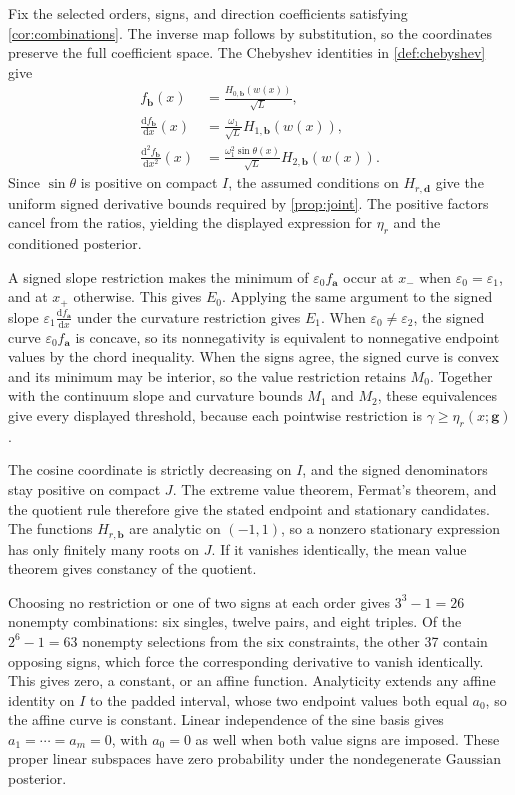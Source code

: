 \begin{proofEnd}
Fix the selected orders, signs, and direction coefficients satisfying
\cref{cor:combinations}. The inverse map follows by substitution, so
the coordinates preserve the full coefficient space. The Chebyshev identities in
\cref{def:chebyshev} give
\[
 \begin{aligned}
 f_{\boldsymbol b}(x)&=\frac{H_{0,\boldsymbol b}(w(x))}{\sqrt L},\\
 \frac{\mathrm{d}f_{\boldsymbol b}}{\mathrm{d}x}(x)
    &=\frac{\omega_1}{\sqrt L}H_{1,\boldsymbol b}(w(x)),\\
 \frac{\mathrm{d}^2f_{\boldsymbol b}}{\mathrm{d}x^2}(x)
    &=\frac{\omega_1^2\sin\theta(x)}{\sqrt L}
       H_{2,\boldsymbol b}(w(x)).
 \end{aligned}
\]
Since $\sin\theta$ is positive on compact $I$, the assumed conditions
on $H_{r,\boldsymbol d}$ give the uniform signed derivative bounds
required by \cref{prop:joint}. The positive factors cancel from the
ratios, yielding the displayed expression for $\eta_r$ and the
conditioned posterior.

A signed slope restriction makes the minimum of
$\varepsilon_0 f_{\boldsymbol a}$ occur at $x_-$ when
$\varepsilon_0=\varepsilon_1$, and at $x_+$ otherwise.
This gives $E_0$. Applying the same argument to the signed slope
$\varepsilon_1\frac{\mathrm{d}f_{\boldsymbol a}}{\mathrm{d}x}$
under the curvature restriction gives $E_1$. When
$\varepsilon_0\ne\varepsilon_2$, the signed curve
$\varepsilon_0 f_{\boldsymbol a}$ is concave, so its nonnegativity
is equivalent to nonnegative endpoint values by the chord inequality.
When the signs agree, the signed curve is convex and its minimum may
be interior, so the value restriction retains $M_0$. Together with
the continuum slope and curvature bounds $M_1$ and $M_2$, these
equivalences give every displayed threshold, because each pointwise
restriction is $\gamma\geq\eta_r(x;\boldsymbol g)$.

The cosine coordinate is strictly decreasing on $I$, and the signed
denominators stay positive on compact $J$. The extreme value theorem,
Fermat's theorem, and the quotient rule therefore give the stated
endpoint and stationary candidates. The functions $H_{r,\boldsymbol b}$
are analytic on $(-1,1)$, so a nonzero stationary expression has only
finitely many roots on $J$. If it vanishes identically, the mean value
theorem gives constancy of the quotient.

Choosing no restriction or one of two signs at each order gives
$3^3-1=26$ nonempty combinations: six singles, twelve pairs, and eight
triples. Of the $2^6-1=63$ nonempty selections from the six constraints,
the other 37 contain opposing signs, which force the corresponding
derivative to vanish identically. This gives zero, a constant, or an
affine function. Analyticity extends any affine identity on $I$ to
the padded interval, whose two endpoint values both equal $a_0$, so
the affine curve is constant. Linear independence of the sine basis
gives $a_1=\cdots=a_m=0$, with $a_0=0$ as well when both value signs
are imposed. These proper linear subspaces have zero probability
under the nondegenerate Gaussian posterior.
\end{proofEnd}
